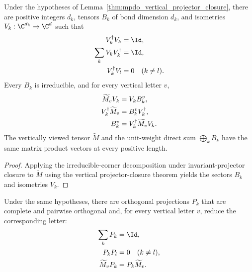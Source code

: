 \begin{lemma}
    \label{thm:mpdo_vertical_irreducible_reducing_sectors}
    \leanok
    Under the hypotheses of
    Lemma~\ref{thm:mpdo_vertical_projector_closure}, there are positive
    integers $d_k$, tensors $B_k$ of bond dimension $d_k$, and isometries
    $V_k:\C^{d_k}\to\C^d$ such that
    \begin{align}
        V_k^\dagger V_k      & =\Id,
        \notag                                  \\
        \sum_kV_kV_k^\dagger & =\Id,
        \notag                                  \\
        V_k^\dagger V_l      & =0\quad(k\ne l).
        \notag
    \end{align}
    Every $B_k$ is irreducible, and for every vertical letter $v$,
    \begin{align}
        \widetilde M_vV_k         & =V_kB_k^v,
        \notag                                                     \\
        V_k^\dagger\widetilde M_v & =B_k^vV_k^\dagger,
        \notag                                                     \\
        B_k^v                     & =V_k^\dagger\widetilde M_vV_k.
        \notag
    \end{align}
    The vertically viewed tensor $\widetilde M$ and the unit-weight direct sum
    $\bigoplus_kB_k$ have the same matrix product vectors at every positive
    length.
\end{lemma}

\begin{proof}
    \leanok
    Applying the irreducible-corner decomposition under invariant-projector
    closure to $\widetilde M$ using the vertical projector-closure theorem
    yields the sectors $B_k$ and isometries $V_k$.
\end{proof}

\begin{lemma}
    \label{thm:mpdo_vertical_complete_reducing_projectors}
    \leanok
    Under the same hypotheses, there are orthogonal projections $P_k$ that
    are complete and pairwise orthogonal and, for every vertical letter $v$,
    reduce the corresponding letter:
    \begin{align}
        \sum_kP_k         & =\Id,
        \notag                                  \\
        P_kP_l            & =0\quad(k\ne l),
        \notag                                  \\
        \widetilde M_vP_k & =P_k\widetilde M_v.
        \notag
    \end{align}
\end{lemma}

